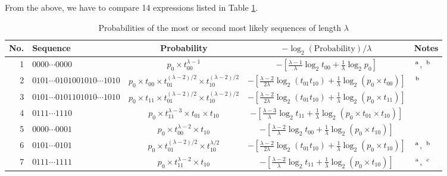 ﻿\documentclass[a4paper,xelatex,english]{bxjsarticle}
\begin{document}
From the above, we have to compare 14 expressions listed in Table \ref{tab:ListProbabilitiesMostLikelySequences}.

\begin{table}[htbp]
\caption{Probabilities of the most or second most likely sequences of length $\lambda$}
\label{tab:ListProbabilitiesMostLikelySequences}
\begin{center}

\begin{tabular}{|r|l|c|c|l|}
\hline
No. & Sequence & Probability & $-\log_{2} ({\textrm{Probability}}) / \lambda$ & Notes\\
\hline 
1 & $0000 \cdots 0000$ & $p_{0} \times t_{00}^{\lambda - 1}$ & $-\left[ \frac{\lambda - 1}{\lambda} \log_{2} t_{00} + \frac{1}{\lambda} \log_{2} p_{0} \right]$ & $^{\textrm{\,a}}$, $^{\textrm{\,b}}$\\
\hline
2 & $0101 \cdots 0101001010 \cdots 1010$ & $p_{0} \times t_{00} \times t_{01}^{(\lambda - 2) / 2} \times t_{10}^{(\lambda - 2) / 2}$ & $-\left[ \frac{\lambda - 2}{2\lambda} \log_{2} \left( t_{01} t_{10} \right) + \frac{1}{\lambda} \log_{2} \left( p_{0} \times t_{00} \right) \right]$ & \quad $^{\textrm{\,b}}$ \\
\hline
3 & $0101 \cdots 0101101010 \cdots 1010$ & $p_{0} \times t_{11} \times t_{01}^{(\lambda - 2) / 2} \times t_{10}^{(\lambda - 2) / 2}$ & $-\left[ \frac{\lambda - 2}{2\lambda} \log_{2} \left( t_{01} t_{10} \right) + \frac{1}{\lambda} \log_{2} \left( p_{0} \times t_{11} \right) \right]$ &  \\
\hline 
4 & $0111 \cdots 1110$ & $p_{0} \times t_{11}^{\lambda - 3} \times t_{01} \times t_{10}$ & $-\left[ \frac{\lambda - 3}{\lambda} \log_{2} t_{11}+ \frac{1}{\lambda} \log_{2} \left( p_{0} \times t_{01} \times t_{10} \right)\right]$ &  \\
\hline 
5 & $0000 \cdots 0001$ & $p_{0} \times t_{00}^{\lambda - 2} \times t_{10}$ & $-\left[ \frac{\lambda - 2}{\lambda} \log_{2} t_{00}+ \frac{1}{\lambda} \log_{2} \left( p_{0} \times t_{10} \right)\right]$ &  \\
\hline 
6 & $0101 \cdots 0101$ & $p_{0} \times t_{01}^{(\lambda - 2) / 2} \times t_{10}^{\lambda / 2}$ & $-\left[ \frac{\lambda - 2}{2\lambda} \log_{2} \left( t_{01} t_{10} \right) + \frac{1}{\lambda} \log_{2} \left( p_{0} \times t_{10} \right) \right]$ & $^{\textrm{\,a}}$, $^{\textrm{\,b}}$ \\
\hline 
7 & $0111 \cdots 1111$ & $p_{0} \times t_{11}^{\lambda - 2} \times t_{10}$ & $-\left[ \frac{\lambda - 2}{\lambda} \log_{2} t_{11}+ \frac{1}{\lambda} \log_{2} \left( p_{0} \times t_{10} \right)\right]$ & $^{\textrm{\,a}}$, \quad $^{\textrm{\,c}}$\\

\end{tabular}
\end{center}
\end{table}
\end{document}
